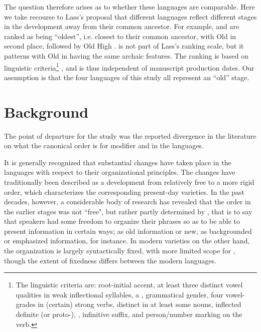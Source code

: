\documentclass[output=paper,colorlinks,citecolor=brown,draft]{langscibook}
\begin{document}
The question therefore arises as to whether these languages are comparable. Here we take recourse to Lass’s \citeyearpar{Lass00} proposal that different  languages reflect different stages in the development away from their common ancestor. For example,  and  are ranked as being “oldest”, i.e. closest to their common ancestor, with Old  in second place, followed by Old High  \citeyearpar[30]{Lass00}.  is not part of Lass’s ranking scale, but it patterns with Old  in having the same archaic features. The ranking is based on linguistic criteria\footnote{The linguistic criteria are: root-initial accent, at least three distinct vowel qualities in weak inflectional syllables, a , grammatical gender, four vowel-grades in (certain) strong verbs, distinct  in at least some nouns, inflected definite  (or proto-),  , infinitive suffix, and person/number marking on the verb.} \citeyearpar[26]{Lass00}, and is thus independent of manuscript production dates. Our assumption is that the four languages of this study all represent an “old” stage.

\section{Background}\label{sectbackground}

The point of departure for the study was the reported divergence in the literature on what the canonical order is for modifier and  in the languages. 

It is generally recognized that substantial changes have taken place in the  languages with respect to their organizational principles. The changes have traditionally been described as a development from relatively free  to a more rigid order, which characterizes the corresponding present-day varieties. In the past decades, however, a considerable body of research has revealed that the order in the earlier stages was not “free", but rather partly determined by , that is to say that speakers had some freedom to organize their phrases so as to be able to present information in certain ways; as old information or new, as backgrounded or emphasized information, for instance. In modern varieties on the other hand, the organization is largely syntactically fixed, with more limited scope for , though the extent of fixedness differs between the modern languages.
\end{document}
